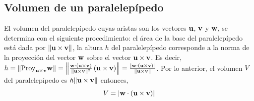 \subsection{Volumen de un paralelepípedo}
El volumen del paralelepípedo cuyas aristas son los vectores $\mathbf{u}$, $\mathbf{v}$ y $\mathbf{w}$,
se determina con el siguiente procedimiento:
el área de la base del paralelepípedo está dada por $\Vert \mathbf{u} \times \mathbf{v}  \Vert$,
la altura $h$ del paralelepípedo corresponde a la norma de la proyección del vector $\mathbf{w}$
sobre el vector $\mathbf{u} \times \mathbf{v}$.
Es decir,
$ h  = \Vert {\rm Proy}_{\mathbf{u} \times \mathbf{v}} \mathbf{w} \Vert =\left\Vert \frac{\mathbf{w} \cdot (\mathbf{u} \times \mathbf{v})}{\Vert\mathbf{u} \times \mathbf{v} \Vert^2 }\,(\mathbf{u} \times \mathbf{v} )\right \Vert = \frac{|\mathbf{w} \cdot (\mathbf{u} \times \mathbf{v})|}{\Vert\mathbf{u} \times \mathbf{v} \Vert }$.
Por lo anterior, el volumen $V$ del paralelepípedo es $h \Vert\mathbf{u} \times \mathbf{v} \Vert$
entonces,
\begin{equation} \label{preliminares4}
  V= |\mathbf{w} \cdot (\mathbf{u} \times \mathbf{v}) |
\end{equation}

